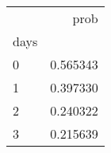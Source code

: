 \begin{tabular}{lr}
\toprule
{} &      prob \\
days &           \\
\midrule
0    &  0.565343 \\
1    &  0.397330 \\
2    &  0.240322 \\
3    &  0.215639 \\
\bottomrule
\end{tabular}

